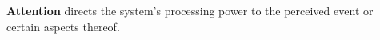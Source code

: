 




\begin{defn}\label{def:attention}
\hypertarget{def:attention}{}\textbf{Attention} directs the system's  processing power to the perceived event or certain aspects thereof.
\end{defn}





